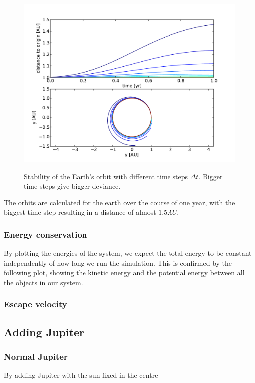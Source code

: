\documentclass[10pt]{article}
\begin{document}
\begin{multicols}{2}
\begin{figure}[H]
    \centering
    \includegraphics[width=1.0\linewidth]{../results/stability_orbits.pdf}
    \label{fig:name}
    \caption{Stability of the Earth's orbit with different time steps $\Delta t$. Bigger time steps give bigger deviance.}
\end{figure}

The orbits are calculated for the earth over the course of one year, with the biggest time step resulting in a distance of almost $1.5AU$.

\subsubsection{Energy conservation}
By plotting the energies of the system, we expect the total energy to be constant independently of how long we run the simulation. This is confirmed by the following plot, showing the kinetic energy and the potential energy between all the objects in our system.

\subsubsection{Escape velocity}

\subsection{Adding Jupiter}
\subsubsection{Normal Jupiter}
By adding Jupiter with the sun fixed in the centre 

\end{multicols}
\end{document}
